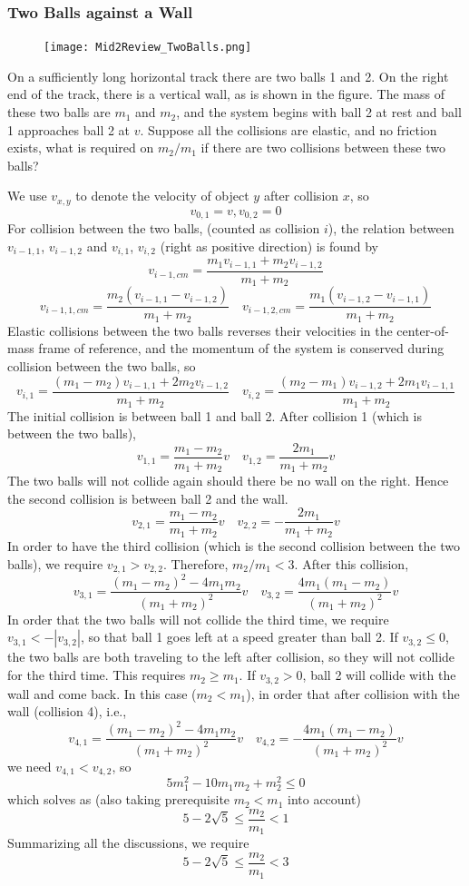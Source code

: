 \documentclass[a4paper,12pt,titlepage]{article}
\begin{document}
\subsubsection{Two Balls against a Wall}
\begin{figure}
\texttt{[image: Mid2Review\_TwoBalls.png]}
\end{figure}
On a sufficiently long horizontal track there are two balls 1 and 2. On the right end of the track, there is a vertical wall, as is shown in the figure.
The mass of these two balls are $m_1$ and $m_2$, and the system begins with ball 2 at rest and ball 1 approaches ball 2 at $v$. Suppose all the collisions are elastic, and no friction exists, what is required on $m_2/m_1$ if there are two collisions between these two balls?

We use $v_{x,y}$ to denote the velocity of object $y$ after collision $x$, so \[v_{0,1}=v, v_{0,2}=0\]
For collision between the two balls, (counted as collision $i$), the relation between $v_{i-1,1}$, $v_{i-1,2}$ and $v_{i,1}$, $v_{i,2}$ (right as positive direction) is found by
\[v_{i-1,cm}=\frac{m_1v_{i-1,1}+m_2v_{i-1,2}}{m_1+m_2}\]
\[v_{i-1,1,cm}=\frac{m_2(v_{i-1,1}-v_{i-1,2})}{m_1+m_2}\quad v_{i-1,2,cm}=\frac{m_1(v_{i-1,2}-v_{i-1,1})}{m_1+m_2}\]
Elastic collisions between the two balls reverses their velocities in the center-of-mass frame of reference, and the momentum of the system is conserved during collision between the two balls, so
\[v_{i,1}=\frac{(m_1-m_2)v_{i-1,1}+2m_2v_{i-1,2}}{m_1+m_2}\quad v_{i,2}=\frac{(m_2-m_1)v_{i-1,2}+2m_1v_{i-1,1}}{m_1+m_2}\]
The initial collision is between ball 1 and ball 2.
After collision 1 (which is between the two balls),
\[v_{1,1}=\frac{m_1-m_2}{m_1+m_2}v\quad v_{1,2}=\frac{2m_1}{m_1+m_2}v\]
The two balls will not collide again should there be no wall on the right. Hence the second collision is between ball 2 and the wall.
\[v_{2,1}=\frac{m_1-m_2}{m_1+m_2}v\quad v_{2,2}=-\frac{2m_1}{m_1+m_2}v\]
In order to have the third collision (which is the second collision between the two balls), we require $v_{2,1}>v_{2,2}$. Therefore, $m_2/m_1<3$.
After this collision,
\[v_{3,1}=\frac{(m_1-m_2)^2-4m_1m_2}{(m_1+m_2)^2}v\quad v_{3,2}=\frac{4m_1(m_1-m_2)}{(m_1+m_2)^2}v\]
In order that the two balls will not collide the third time, we require
$v_{3,1}<-|v_{3,2}|$, so that ball 1 goes left at a speed greater than ball 2.
If $v_{3,2}\leq 0$, the two balls are both traveling to the left after collision, so they will not collide for the third time. This requires $m_2\geq m_1$.
If $v_{3,2}>0$, ball 2 will collide with the wall and come back. In this case ($m_2<m_1$), in order that after collision with the wall (collision 4), i.e., 
\[v_{4,1}=\frac{(m_1-m_2)^2-4m_1m_2}{(m_1+m_2)^2}v\quad v_{4,2}=-\frac{4m_1(m_1-m_2)}{(m_1+m_2)^2}v\]
we need $v_{4,1}<v_{4,2}$, so
\[5m_1^2-10 m_1m_2+m_2^2\leq 0\]
which solves as (also taking prerequisite $m_2<m_1$ into account)\[5-2\sqrt 5\leq \frac{m_2}{m_1}<1\]
Summarizing all the discussions, we require
\[5-2\sqrt 5\leq \frac{m_2}{m_1}<3\]
\end{document}
